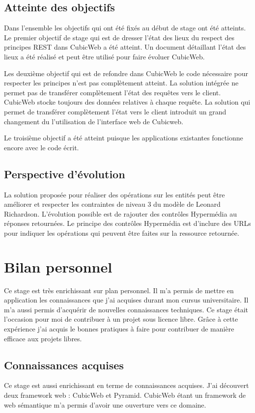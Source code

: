 \subsection{Atteinte des objectifs}
Dans l'ensemble les objectifs qui ont été fixés au début de stage ont été atteints. Le premier objectif de stage qui est de dresser l'état des lieux du respect des principes REST dans CubicWeb a été atteint. Un document détaillant l'état des lieux a été réalisé et peut être utilisé pour faire évoluer CubicWeb. 

Les deuxième objectif qui est de refondre dans CubicWeb le code nécessaire pour respecter les principes n'est pas complètement atteint. La solution intégrée ne permet pas de transférer complètement l'état des requêtes vers le client. CubicWeb stocke toujours des données relatives à chaque requête. La solution qui permet de transférer complètement l'état vers le client introduit un grand changement du l'utilisation de l'interface web de Cubicweb. 

Le troisième objectif a été atteint puisque les applications existantes fonctionne encore avec le code écrit.

\subsection{Perspective d'évolution}
La solution proposée pour réaliser des opérations  sur les entités peut être améliorer et respecter les contraintes de niveau 3 du modèle de Leonard Richardson. L'évolution possible est de rajouter des contrôles Hypermédia au réponses retournées. Le principe des contrôles Hypermédia est d'inclure des URLs pour indiquer les opérations qui peuvent être faites sur la ressource retournée. 

\section{Bilan personnel}
Ce stage est très enrichissant sur plan personnel. Il m'a permis de mettre en application les connaissances que j'ai acquises durant mon cursus universitaire. Il m'a aussi permis d'acquérir de nouvelles connaissances techniques. Ce stage était l'occasion pour moi de contribuer à un projet sous licence libre. Grâce à cette expérience j'ai acquis le bonnes pratiques à faire pour contribuer de manière efficace aux projets libres.  
\subsection{Connaissances acquises}
Ce stage est aussi enrichissant en terme de connaissances acquises. J'ai découvert deux framework web : CubicWeb et Pyramid. CubicWeb étant un framework de web sémantique m'a permis d'avoir une ouverture vers ce domaine. 

